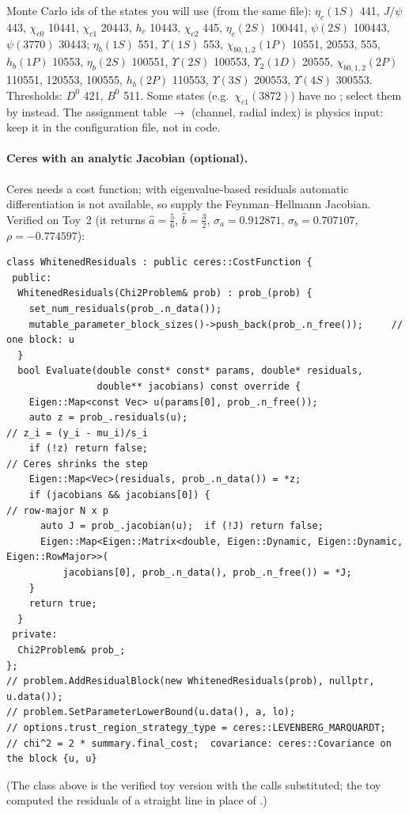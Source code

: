 \documentclass[11pt,a4paper]{article}
\numberwithin{equation}{section}
\theoremstyle{definition}
\theoremstyle{plain}
\theoremstyle{remark}
\numberwithin{algorithm}{section}
\begin{document}
Monte Carlo ids of the states you will use (from the same file): $\eta_c(1S)$ 441, $J/\psi$ 443, $\chi_{c0}$ 10441, $\chi_{c1}$ 20443, $h_c$ 10443, $\chi_{c2}$ 445, $\eta_c(2S)$ 100441, $\psi(2S)$ 100443, $\psi(3770)$ 30443; $\eta_b(1S)$ 551, $\Upsilon(1S)$ 553, $\chi_{b0,1,2}(1P)$ 10551, 20553, 555, $h_b(1P)$ 10553, $\eta_b(2S)$ 100551, $\Upsilon(2S)$ 100553, $\Upsilon_2(1D)$ 20555, $\chi_{b0,1,2}(2P)$ 110551, 120553, 100555, $h_b(2P)$ 110553, $\Upsilon(3S)$ 200553, $\Upsilon(4S)$ 300553. Thresholds: $D^0$ 421, $B^0$ 511. Some states (e.g.\ $\chi_{c1}(3872)$) have no ; select them by  instead. The assignment table  $\to$ (channel, radial index) is physics input: keep it in the configuration file, not in code.

\paragraph{Ceres with an analytic Jacobian (optional).} Ceres needs a cost function; with eigenvalue-based residuals automatic differentiation is not available, so supply the Feynman--Hellmann Jacobian. Verified on Toy~2 (it returns $\hat a=\frac56$, $\hat b=\frac32$, $\sigma_a=0.912871$, $\sigma_b=0.707107$, $\rho=-0.774597$):
\begin{lstlisting}[style=cpp]
class WhitenedResiduals : public ceres::CostFunction {
 public:
  WhitenedResiduals(Chi2Problem& prob) : prob_(prob) {
    set_num_residuals(prob_.n_data());
    mutable_parameter_block_sizes()->push_back(prob_.n_free());     // one block: u
  }
  bool Evaluate(double const* const* params, double* residuals,
                double** jacobians) const override {
    Eigen::Map<const Vec> u(params[0], prob_.n_free());
    auto z = prob_.residuals(u);                                     // z_i = (y_i - mu_i)/s_i
    if (!z) return false;                                            // Ceres shrinks the step
    Eigen::Map<Vec>(residuals, prob_.n_data()) = *z;
    if (jacobians && jacobians[0]) {                                 // row-major N x p
      auto J = prob_.jacobian(u);  if (!J) return false;
      Eigen::Map<Eigen::Matrix<double, Eigen::Dynamic, Eigen::Dynamic, Eigen::RowMajor>>(
          jacobians[0], prob_.n_data(), prob_.n_free()) = *J;
    }
    return true;
  }
 private:
  Chi2Problem& prob_;
};
// problem.AddResidualBlock(new WhitenedResiduals(prob), nullptr, u.data());
// problem.SetParameterLowerBound(u.data(), a, lo);
// options.trust_region_strategy_type = ceres::LEVENBERG_MARQUARDT;
// chi^2 = 2 * summary.final_cost;  covariance: ceres::Covariance on the block {u, u}
\end{lstlisting}
(The class above is the verified toy version with the  calls substituted; the toy computed the residuals of a straight line in place of .)
\end{document}
